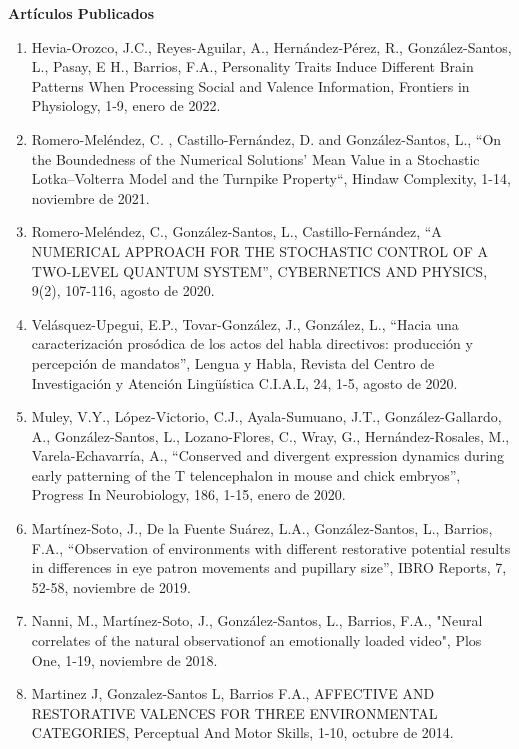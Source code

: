 \textbf{Artículos Publicados}

\hfill

\begin{enumerate}

\item Hevia-Orozco, J.C., Reyes-Aguilar, A., Hernández-Pérez, R., González-Santos, L., Pasay, E H., Barrios, F.A., Personality 
Traits Induce Different Brain Patterns When Processing Social and Valence Information, Frontiers in Physiology, 1-9, enero de 2022.

\item Romero-Meléndez, C. , Castillo-Fernández, D. and González-Santos, L., “On the Boundedness of the Numerical Solutions’ 
Mean Value in a Stochastic Lotka–Volterra Model and the Turnpike Property“, Hindaw Complexity, 1-14, noviembre de 2021.

\item Romero-Meléndez, C., González-Santos, L., Castillo-Fernández, “A NUMERICAL APPROACH FOR THE STOCHASTIC CONTROL OF A 
TWO-LEVEL QUANTUM SYSTEM”, CYBERNETICS AND PHYSICS, 9(2), 107-116, agosto de 2020.

\item Velásquez-Upegui, E.P., Tovar-González, J., González, L., “Hacia una caracterización prosódica de los actos del habla 
directivos: producción y percepción de mandatos”, Lengua y Habla, Revista del Centro de Investigación y Atención 
Lingüística C.I.A.L, 24, 1-5, agosto de 2020.

\item Muley, V.Y., López-Victorio, C.J., Ayala-Sumuano, J.T., González-Gallardo, A., González-Santos, L., Lozano-Flores, C., 
Wray, G., Hernández-Rosales, M., Varela-Echavarría, A., “Conserved and divergent expression dynamics during early 
patterning of the T telencephalon in mouse and chick embryos”, Progress In Neurobiology, 186, 1-15, enero de 2020.

\item Martínez-Soto, J., De la Fuente Suárez, L.A., González-Santos, L., Barrios, F.A., “Observation of environments with 
different restorative potential results in differences in eye patron movements and pupillary size”, IBRO Reports, 7, 52-58, noviembre de 2019.

\item Nanni, M., Martínez-Soto, J., González-Santos, L., Barrios, F.A., "Neural correlates of the natural observationof an 
emotionally loaded video", Plos One, 1-19, noviembre de 2018.

\item Martinez J, Gonzalez-Santos L, Barrios F.A., AFFECTIVE AND RESTORATIVE VALENCES FOR THREE ENVIRONMENTAL CATEGORIES, 
Perceptual And Motor Skills, 1-10, octubre de 2014.


\end{enumerate}
